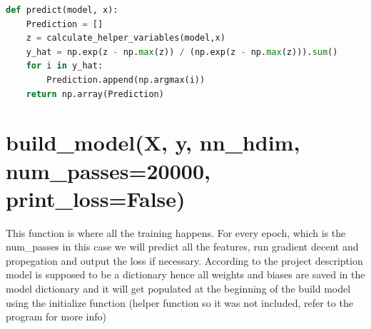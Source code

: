 \documentclass{article}
\begin{document}
\begin{lstlisting}[language=Python]
	def predict(model, x):
    Prediction = []
    z = calculate_helper_variables(model,x)
    y_hat = np.exp(z - np.max(z)) / (np.exp(z - np.max(z))).sum()
    for i in y_hat:
        Prediction.append(np.argmax(i))
    return np.array(Prediction)
	\end{lstlisting}
	

\section{build\_model(X, y, nn\_hdim, num\_passes=20000, print\_loss=False)}
This function is where all the training happens. For every epoch, which is the num\_passes in this case we will predict all the features, run gradient decent and propegation and output the loss if necessary. According to the project description model is supposed to be a dictionary hence all weights and biases are saved in the model dictionary and it will get populated at the beginning of the build model using the initialize function (helper function so it was not included, refer to the program for more info)
	
\end{document}
